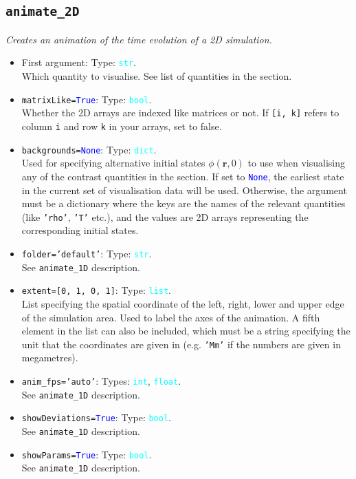 \documentclass{article}
\newcommand{\ttt}[1]{\texttt{#1}}
\newcommand{\ptype}[1]{\texttt{\textcolor{cyan}{#1}}}
\newcommand{\cbl}[1]{\textcolor{blue}{#1}}
\newcommand{\cro}[1]{\textcolor{RedOrange}{#1}}
\newcommand{\cyo}[1]{\textcolor{YellowOrange}{#1}}
\begin{document}
\subsection{\ttt{animate\_2D}}
\label{sec:anim2}
\textit{Creates an animation of the time evolution of a 2D simulation.}
\begin{itemize}
	\item First argument: Type: \ptype{str}.\\Which quantity to visualise. See list of quantities in the  section.
	\item \ttt{\cro{matrixLike}=\cbl{True}}: Type: \ptype{bool}.\\Whether the 2D arrays are indexed like matrices or not. If \ttt{[i, k]} refers to column \ttt{i} and row \ttt{k} in your arrays, set to false.
	\item \ttt{\cro{backgrounds}=\cbl{None}}: Type: \ptype{dict}.\\Used for specifying alternative initial states $\phi(\mathbf{r}, 0)$ to use when visualising any of the contrast quantities in the  section. If set to \ttt{\cbl{None}}, the earliest state in the current set of visualisation data will be used. Otherwise, the argument must be a dictionary where the keys are the names of the relevant quantities (like \ttt{\cyo{'rho'}}, \ttt{\cyo{'T'}} etc.), and the values are 2D arrays representing the corresponding initial states.
	\item \ttt{\cro{folder}=\cyo{'default'}}: Type: \ptype{str}.\\See \ttt{animate\_1D} description.
	\item \ttt{\cro{extent}=[0, 1, 0, 1]}: Type: \ptype{list}.\\List specifying the spatial coordinate of the left, right, lower and upper edge of the simulation area. Used to label the axes of the animation. A fifth element in the list can also be included, which must be a string specifying the unit that the coordinates are given in (e.g. \ttt{'Mm'} if the numbers are given in megametres).
	\item \ttt{\cro{anim\_fps}=\cyo{'auto'}}: Types: \ptype{int}, \ptype{float}.\\See \ttt{animate\_1D} description.
	\item \ttt{\cro{showDeviations}=\cbl{True}}: Type: \ptype{bool}.\\See \ttt{animate\_1D} description.
	\item \ttt{\cro{showParams}=\cbl{True}}: Type: \ptype{bool}.\\See \ttt{animate\_1D} description.

\end{itemize}
\end{document}
